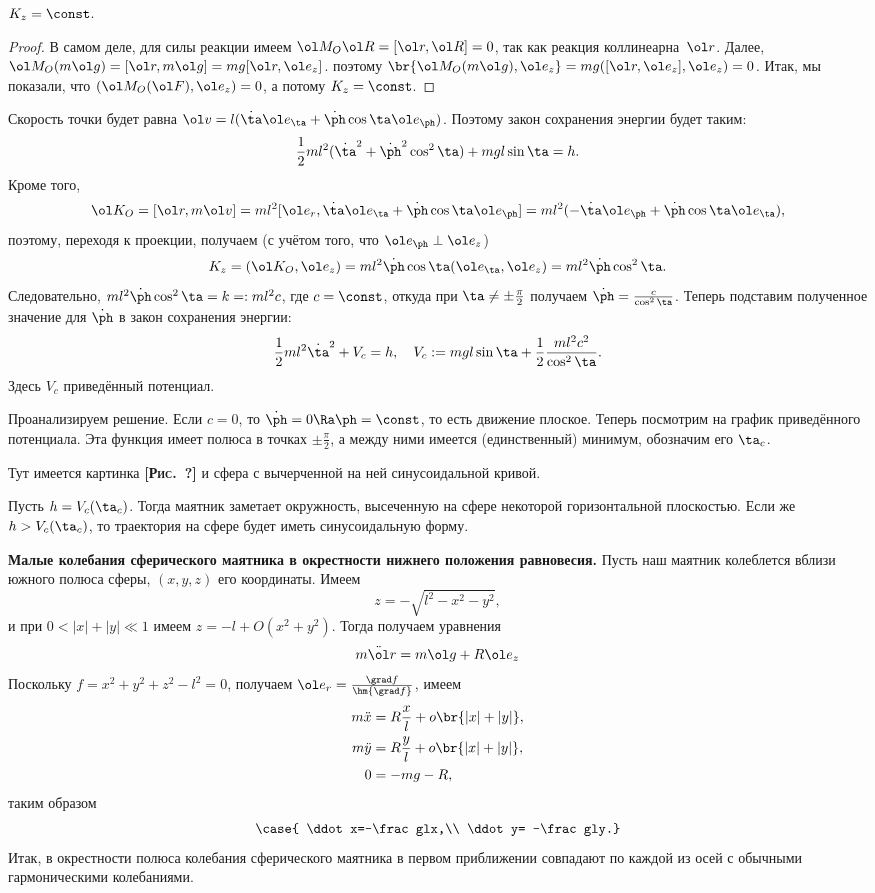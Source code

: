 \documentclass[a4paper,12pt]{article}
\def\F{\ol F}
\def\r{\ol r}
\def\v{\ol v}
\def\e{\ol e}
\def\vR{\ol R}
\def\K{\ol K_O}
\def\MO{\ol M_O}
\def\dd{\ddot}
\def\d{\dot}
\def\pic#1{ \hbox{\textbf{\textsc{[Рис.~#1]}}}}
\begin{document}
\begin{stm}
$K_z = \const$.
\end{stm}
\begin{proof}
В самом деле, для силы реакции имеем $\MO\vR = [\r,\vR] = 0$, так как реакция коллинеарна~$\r$.
Далее, $\MO(m\ol g) = [\r,m\ol g] = mg[\r,\e_z]$. поэтому $\br{\MO(m\ol g),\e_z} = mg([\r,\e_z],\e_z) = 0$.
Итак, мы показали, что $(\MO(\F),\e_z) = 0$, а потому $K_z=\const$.
\end{proof}

Скорость точки  будет равна $\v= l(\d\ta \e_\ta + \d\ph \cos\ta \e_\ph)$. Поэтому закон сохранения энергии будет таким:
$$\frac12ml^2(\d\ta^2+\d\ph^2\cos^2\ta)+mgl\sin\ta=h.$$
Кроме того,
$$\K=[\r,m\v] = ml^2[\e_r,\d\ta\e_\ta+\d\ph\cos\ta\e_\ph]=ml^2(-\d\ta\e_\ph+\d\ph\cos\ta\e_\ta),$$
поэтому, переходя к проекции, получаем (с учётом того, что $\e_\ph \perp \e_z$)
$$K_z=(\K,\e_z)=ml^2\d\ph\cos\ta(\e_\ta,\e_z)=ml^2\d\ph\cos^2\ta.$$
Следовательно, $ml^2\d\ph\cos^2\ta=k=:ml^2c$, где $c = \const$, откуда при $\ta \ne \pm \frac\pi2$
получаем $\d\ph=\frac{c}{\cos^2\ta}$.
Теперь подставим полученное значение для $\d\ph$ в закон сохранения энергии:
$$
\frac12ml^2\d\ta^2+V_c=h, \quad
V_c:=mgl\sin\ta+\frac12\frac{ml^2c^2}{\cos^2\ta}.
$$
Здесь $V_c$ приведённый потенциал.

Проанализируем решение. Если $c=0$, то $\d\ph=0\Ra\ph=\const$, то есть движение плоское.
Теперь посмотрим на график приведённого потенциала. Эта функция имеет полюса в точках $\pm \frac\pi2$,
а между ними имеется (единственный) минимум, обозначим его $\ta_c$.

Тут имеется картинка \pic{?} и сфера с вычерченной на ней синусоидальной кривой.

Пусть $h = V_c(\ta_c)$. Тогда маятник заметает окружность, высеченную на сфере некоторой
горизонтальной плоскостью. Если же $h > V_c(\ta_c)$, то траектория на сфере будет
иметь синусоидальную форму.



\textbf{Малые колебания сферического маятника в окрестности
нижнего положения равновесия.} Пусть наш маятник колеблется вблизи южного полюса сферы,
$(x,y,z)$ его координаты. Имеем
$$z=-\sqrt{l^2-x^2-y^2},$$
и при $0<|x|+|y| \ll 1$ имеем
$z=-l+O(x^2+y^2)$.
Тогда получаем уравнения
$$m\dd\r=m\ol g+R\e_z
$$
Поскольку $f=x^2+y^2+z^2-l^2=0$,
получаем $\e_r=\frac{\grad f}{\hm{\grad f}}$, имеем
$$\begin{aligned}
m\dd x&=R\frac xl+o\br{|x|+|y|},\\
m\dd y&=R\frac yl+o\br{|x|+|y|},\\
0&=-mg-R,
\end{aligned}$$
таким образом
$$\case{
\dd x=-\frac glx,\\
\dd y= -\frac gly.}
$$
Итак, в окрестности полюса колебания сферического маятника в первом приближении
совпадают по каждой из осей с обычными гармоническими колебаниями.
\end{document}
